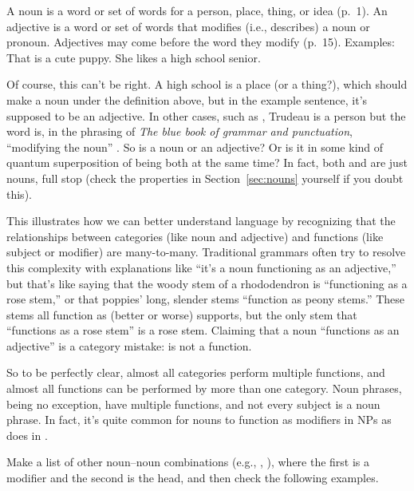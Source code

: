 \ea\label{ex:blue-book-definitions}
    \ea A noun is a word or set of words for a person, place, thing, or idea (p.~1).
    \ex An adjective is a word or set of words that modifies (i.e., describes) a noun or pronoun. Adjectives may come before the word they modify (p.~15).
    \ex Examples:
        \ea
            \ex That is a cute puppy.
            \ex She likes a high school senior.
        \z
\z
\z
    
Of course, this can't be right. A high school is a place (or a thing?), which should make  a noun under the definition above, but in the example sentence, it's supposed to be an adjective. In other cases, such as , Trudeau is a person but the word is, in the phrasing of \textit{The blue book of grammar and punctuation}, \enquote{modifying the noun} . So is  a noun or an adjective? Or is it in some kind of quantum superposition of being both at the same time? In fact, both  and  are just nouns, full stop (check the properties in Section~\ref{sec:nouns} yourself if you doubt this).

This illustrates how we can better understand language by recognizing that the relationships between categories (like noun and adjective) and functions (like subject or modifier) are many-to-many. Traditional grammars often try to resolve this complexity with explanations like ``it's a noun functioning as an adjective,'' but that's like saying that the woody stem of a rhododendron is ``functioning as a rose stem,'' or that poppies' long, slender stems ``function as peony stems.'' These stems all function as (better or worse) supports, but the only stem that ``functions as a rose stem'' is a rose stem. Claiming that a noun ``functions as an adjective'' is a category mistake:  is not a function.

So to be perfectly clear, almost all categories perform multiple functions, and almost all functions can be performed by more than one category. Noun phrases, being no exception, have multiple functions, and not every subject is a noun phrase. In fact, it's quite common for nouns to function as modifiers in NPs as  does in .


Make a list of other noun–noun combinations (e.g., , ), where the first is a modifier and the second is the head, and then check the following examples.

